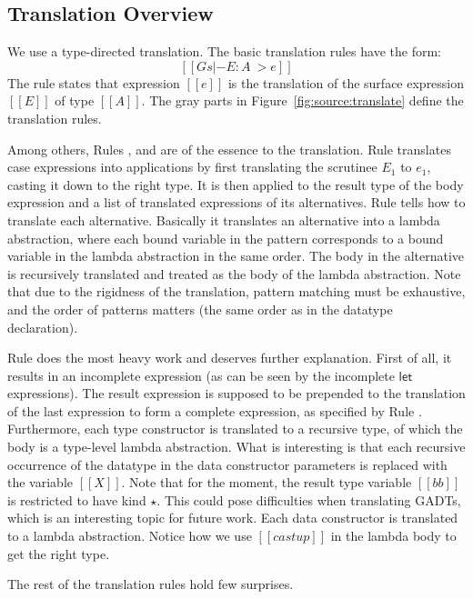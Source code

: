 \subsection{Translation Overview}

We use a type-directed translation. The basic translation rules have the form:
\[
[[Gs  |- E : A ~> e]]
\]
The rule states that \name expression $[[e]]$ is the translation of the
surface expression $[[E]]$ of type $[[A]]$.  The gray parts in
Figure~\ref{fig:source:translate} define the translation
rules. 

Among others, Rules ,  and
 are of the essence to the translation. Rule
 translates case expressions into applications by
first translating the scrutinee $E_1$ to $e_1$, casting it down to the
right type. It is then applied to the result type of the body
expression and a list of translated \name expressions of its
alternatives. Rule  tells how to translate each
alternative. Basically it translates an alternative into a lambda
abstraction, where each bound variable in the pattern corresponds to a
bound variable in the lambda abstraction in the same order. The body
in the alternative is recursively translated and treated as the body
of the lambda abstraction. Note that due to the rigidness of the
translation, pattern matching must be exhaustive, and the order of
patterns matters (the same order as in the datatype declaration).

Rule  does the most heavy work and deserves
further explanation. First of all, it results in an incomplete
expression (as can be seen by the incomplete $\mathsf{let}$
expressions). The result expression is supposed to be prepended to the
translation of the last expression to form a complete \name
expression, as specified by Rule . Furthermore,
each type constructor is translated to a recursive type, of which the
body is a type-level lambda abstraction. What is interesting is that
each recursive occurrence of the datatype in the data constructor
parameters is replaced with the variable $[[X]]$. Note that
for the moment, the result type variable $[[bb]]$ is restricted to
have kind $\star$. This could pose difficulties when translating
GADTs, which is an interesting topic for future work. Each data constructor is
translated to a lambda abstraction. Notice how we use $[[castup]]$ in
the lambda body to get the right type.

The rest of the translation rules hold few surprises.

